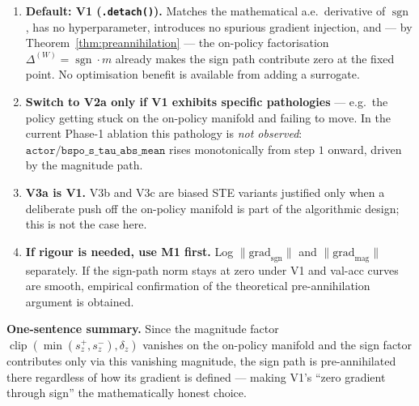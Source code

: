 \documentclass[11pt]{article}
\DeclareMathOperator*{\clip}{clip}
\DeclareMathOperator{\sign}{sgn}
\begin{document}
\begin{enumerate}
\item \textbf{Default: V1 (\texttt{.detach()}).} Matches the mathematical
a.e.\ derivative of $\sign$, has no hyperparameter, introduces no
spurious gradient injection, and --- by
Theorem~\ref{thm:preannihilation} --- the on-policy factorisation
$\Delta^{(W)} = \sign\cdot m$ already makes the sign path contribute
zero at the fixed point. No optimisation benefit is available from
adding a surrogate.

\item \textbf{Switch to V2a only if V1 exhibits specific pathologies} ---
e.g.\ the policy getting stuck on the on-policy manifold and failing to
move. In the current Phase-1 ablation this pathology is
\emph{not observed}: $\texttt{actor/bspo\_s\_tau\_abs\_mean}$
rises monotonically from step $1$ onward, driven by the magnitude path.

\item \textbf{V3a is V1.} V3b and V3c are biased STE variants justified
only when a deliberate push off the on-policy manifold is part of the
algorithmic design; this is not the case here.

\item \textbf{If rigour is needed, use M1 first.} Log
$\|\text{grad}_{\text{sgn}}\|$ and $\|\text{grad}_{\text{mag}}\|$
separately. If the sign-path norm stays at zero under V1 and val-acc
curves are smooth, empirical confirmation of the theoretical
pre-annihilation argument is obtained.
\end{enumerate}

\textbf{One-sentence summary.} Since the magnitude factor
$\clip(\min(s_z^+, s_z^-), \delta_z)$ vanishes on the on-policy manifold
and the sign factor contributes only via this vanishing magnitude, the
sign path is pre-annihilated there regardless of how its gradient is
defined --- making V1's ``zero gradient through sign'' the
mathematically honest choice.
\end{document}
